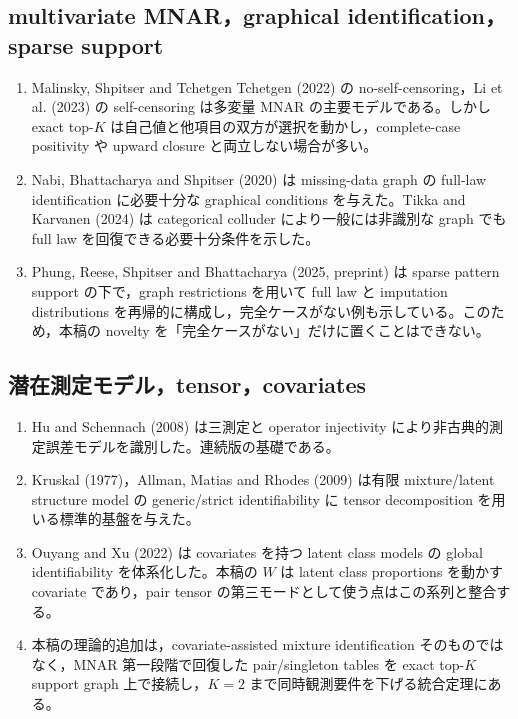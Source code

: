 \documentclass[11pt,a4paper]{ltjsarticle}
\theoremstyle{remark}\newtheorem{remark}{注意}[section]
\begin{document}
\subsection{multivariate MNAR，graphical identification，sparse support}
\begin{enumerate}
\item Malinsky, Shpitser and Tchetgen Tchetgen (2022) の no-self-censoring，Li et al. (2023) の self-censoring は多変量 MNAR の主要モデルである。しかし exact top-$K$ は自己値と他項目の双方が選択を動かし，complete-case positivity や upward closure と両立しない場合が多い。
\item Nabi, Bhattacharya and Shpitser (2020) は missing-data graph の full-law identification に必要十分な graphical conditions を与えた。Tikka and Karvanen (2024) は categorical colluder により一般には非識別な graph でも full law を回復できる必要十分条件を示した。
\item Phung, Reese, Shpitser and Bhattacharya (2025, preprint) は sparse pattern support の下で，graph restrictions を用いて full law と imputation distributions を再帰的に構成し，完全ケースがない例も示している。このため，本稿の novelty を「完全ケースがない」だけに置くことはできない。
\end{enumerate}

\subsection{潜在測定モデル，tensor，covariates}
\begin{enumerate}
\item Hu and Schennach (2008) は三測定と operator injectivity により非古典的測定誤差モデルを識別した。連続版の基礎である。
\item Kruskal (1977)，Allman, Matias and Rhodes (2009) は有限 mixture/latent structure model の generic/strict identifiability に tensor decomposition を用いる標準的基盤を与えた。
\item Ouyang and Xu (2022) は covariates を持つ latent class models の global identifiability を体系化した。本稿の $W$ は latent class proportions を動かす covariate であり，pair tensor の第三モードとして使う点はこの系列と整合する。
\item 本稿の理論的追加は，covariate-assisted mixture identification そのものではなく，MNAR 第一段階で回復した pair/singleton tables を exact top-$K$ support graph 上で接続し，$K=2$ まで同時観測要件を下げる統合定理にある。
\end{enumerate}
\end{document}
